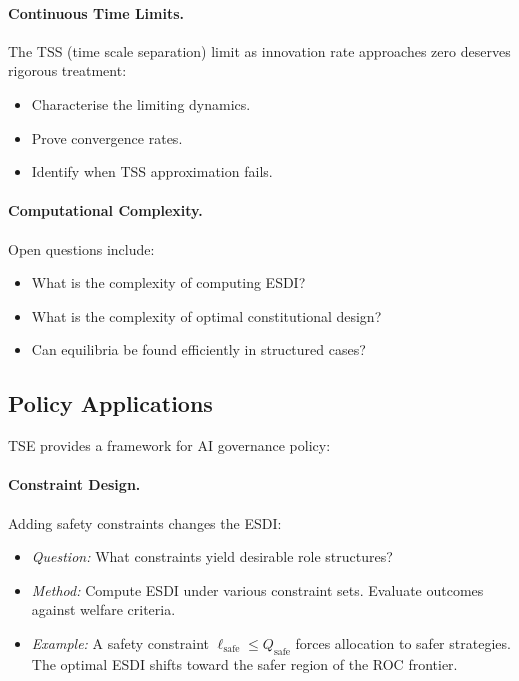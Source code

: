 \documentclass[12pt]{article}
\begin{document}
\paragraph{Continuous Time Limits.} The TSS (time scale separation) limit as innovation rate approaches zero deserves rigorous treatment:
\begin{itemize}
    \item Characterise the limiting dynamics.
    \item Prove convergence rates.
    \item Identify when TSS approximation fails.
\end{itemize}

\paragraph{Computational Complexity.} Open questions include:
\begin{itemize}
    \item What is the complexity of computing ESDI?
    \item What is the complexity of optimal constitutional design?
    \item Can equilibria be found efficiently in structured cases?
\end{itemize}

\subsection{Policy Applications}

TSE provides a framework for AI governance policy:

\paragraph{Constraint Design.} Adding safety constraints changes the ESDI:
\begin{itemize}
    \item \textit{Question:} What constraints yield desirable role structures?
    \item \textit{Method:} Compute ESDI under various constraint sets. Evaluate outcomes against welfare criteria.
    \item \textit{Example:} A safety constraint $\ell_{\text{safe}} \leq Q_{\text{safe}}$ forces allocation to safer strategies. The optimal ESDI shifts toward the safer region of the ROC frontier.
\end{itemize}
\end{document}
